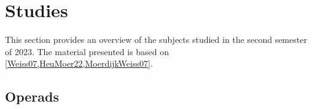 \documentclass[11pt, reqno]{amsart}
\theoremstyle{definition}
\begin{document}



\section{Studies}

This section provides an overview of the subjects studied in the second semester of 2023. The material presented is based on \cref{Weiss07,HeuMoer22,MoerdijkWeiss07}.

\subsection{Operads}
\end{document}
